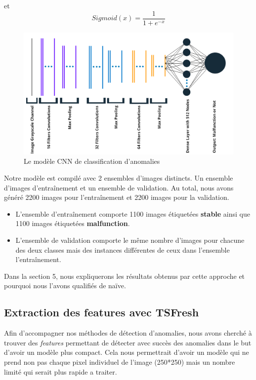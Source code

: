 \documentclass[french]{article}
\theoremstyle{mytheoremstyle}
\theoremstyle{mytheoremstyle}
\theoremstyle{myproblemstyle}
\begin{document}
        et
        \[
        Sigmoid(x) = \dfrac{1}{1+e^{-x}}
        \]
        \begin{figure}[H]
            \centering
            \includegraphics[width=\textwidth]{images/cnn.png}
            \caption{Le modèle CNN de classification d'anomalies}
            \label{}
        \end{figure}
        Notre modèle est compilé avec 2 ensembles d'images distincts. Un ensemble d'images d'entraînement et un ensemble de validation. Au total, nous avons généré 2200 images pour l'entraînement et 2200 images pour la validation.
        \newline
        \begin{itemize}
            \item L'ensemble d'entraînement comporte 1100 images étiquetées \textbf{stable} ainsi que 1100 images étiquetées \textbf{malfunction}.
            \item L'ensemble de validation comporte le même nombre d'images pour chacune des deux classes mais des instances différentes de ceux dans l'ensemble l'entraînement.
        \end{itemize}
        Dans la section 5, nous expliquerons les résultats obtenus par cette approche et pourquoi nous l'avons qualifiés de naïve.
        \subsection{Extraction des features avec TSFresh}
        Afin d'accompagner nos méthodes de détection d'anomalies, nous avons cherché à trouver des \emph{features} permettant de détecter avec succès des anomalies dans le but d'avoir un modèle plus compact. Cela nous permettrait d'avoir un modèle qui ne prend non pas chaque pixel individuel de l'image (250*250) mais un nombre limité qui serait plus rapide a traiter. 
        
\end{document}
